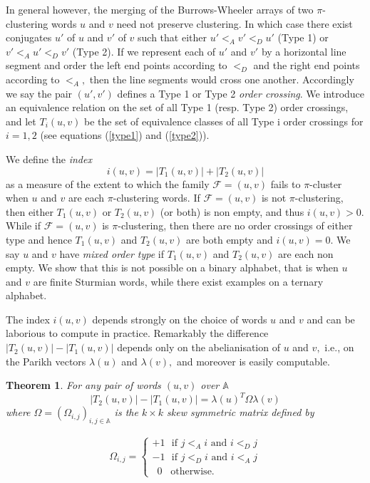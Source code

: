\documentclass[12pt,a4paper]{amsart}
\newcommand{\A}{{\mathbb A}}
\newtheorem{theorem}{Theorem}
\begin{document}
In general however, the merging of the Burrows-Wheeler arrays of  two $\pi$-clustering words $u$ and $v$ need not preserve clustering.  In which case there exist conjugates $u'$ of $u$ and $v'$ of $v$ such that either $u'<_A  v' <_D u'$ (Type 1) or $v'<_A u' <_D v'$ (Type 2). If we represent each of $u'$ and $v'$ by a horizontal line segment and order the left end points according to $<_D$ and the right end points according to $<_A,$ then  the line segments would cross one another. Accordingly we say the pair $(u',v')$ defines a Type 1 or Type 2 {\it order crossing}. We introduce an equivalence relation on the set of all Type 1 (resp. Type 2) order crossings, and let $T_i(u,v)$ be the set of equivalence classes of all Type i order crossings for $i=1,2$  (see equations (\ref{type1}) and (\ref{type2})). 


We define the {\it index} \[i(u,v)= |T_1(u,v)|+|T_2(u,v)|\] as a measure of the extent to which the family $\mathcal F=(u,v)$ fails to $\pi$-cluster when $u$ and $v$ are each $\pi$-clustering words. If $\mathcal F=(u,v)$ is not $\pi$-clustering, then either $T_1(u,v)$ or $T_2(u,v)$ (or both) is non empty, and thus $i(u,v)>0.$ While if  $\mathcal F=(u,v)$ is $\pi$-clustering, then there are no order crossings of either type and hence $T_1(u,v)$ and $T_2(u,v)$ are both empty and  $i(u,v)=0.$ We say $u$ and $v$ have {\it mixed order type} if $T_1(u,v)$ and $T_2(u,v)$ are each non empty. We show that this is not possible on a binary alphabet, that is when $u$ and $v$ are finite Sturmian words, while there exist examples on a ternary alphabet.  




The index $i(u,v)$ depends strongly on the choice of words $u$ and $v$ and can be laborious to compute in practice.  Remarkably the difference $|T_2(u,v)|-|T_1(u,v)|$ depends only on the abelianisation  of $u$ and $v,$ i.e.,  on the Parikh vectors $\lambda (u)$ and  $\lambda(v),$  and moreover is easily computable. 

\begin{theorem}\label{tA}
For any pair of words $(u,v)$ over $\A$ 
\[|T_2(u,v)|-|T_1(u,v)|=\lambda (u)^T \Omega \lambda(v)\]
where  $\Omega=(\Omega_{i,j})_{i,j\in \A}$  is the $k\times k$ skew symmetric matrix 
defined by

\begin{align}\label{Omegaij} \Omega_{i,j}= \begin{cases} +1\,\,\,\, \text{if  $j<_A i$ and $i<_D j$}\\ 
-1\,\,\,\, \text{if  $j<_D i$ and $i<_A j$}\\\,\,\,0\,\,\,\,\, \text{otherwise.} \end{cases}
\end{align}
\end{theorem}
\end{document}

